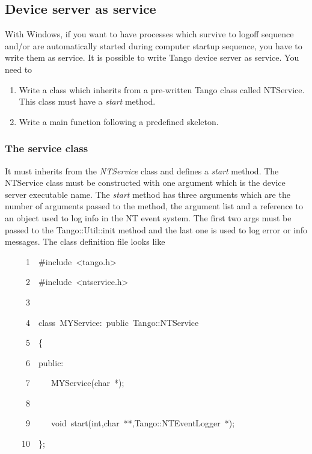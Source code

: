 \subsection{Device server as service}

With Windows, if you want to have processes which survive to logoff
sequence and/or are automatically started during computer startup
sequence, you have to write them as service. It is
possible to write Tango device server as service. You need to
\begin{enumerate}
\item Write a class which inherits from a pre-written Tango class called
NTService. This class must have a \emph{start} method. 
\item Write a main function following a predefined skeleton.
\end{enumerate}

\subsubsection{The service class}

It must inherits from the \emph{NTService} class and defines a \emph{start}
method. The NTService class must be constructed
with one argument which is the device server executable
name. The \emph{start} method has three arguments which are the number
of arguments passed to the method, the argument list and a reference
to an object used to log info in the NT event system. The first two
args must be passed to the Tango::Util::init method and the last one
is used to log error or info messages. The class definition file looks
like


\begin{lyxcode}
~~~~~1~~\#include~<tango.h>

~~~~~2~~\#include~<ntservice.h>

~~~~~3~~

~~~~~4~~class~MYService:~public~Tango::NTService

~~~~~5~~\{

~~~~~6~~public:

~~~~~7~~~~~MYService(char~{*});

~~~~~8~~

~~~~~9~~~~~void~start(int,char~{*}{*},Tango::NTEventLogger~{*});

~~~~10~~\};
\end{lyxcode}




